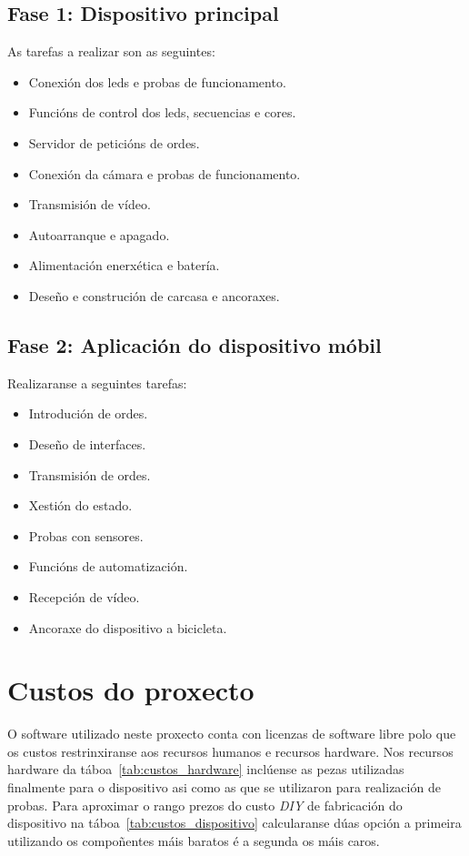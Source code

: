 \subsection{Fase 1: Dispositivo principal}
As tarefas a realizar son as seguintes:
\begin{itemize}
    \item Conexión dos leds e probas de funcionamento.
    \item Funcións de control dos leds, secuencias e cores.
    \item Servidor de peticións de ordes.
    \item Conexión da cámara e probas de funcionamento.
    \item Transmisión de vídeo.
    \item Autoarranque e apagado.
    \item Alimentación enerxética e batería.
    \item Deseño e construción de carcasa e ancoraxes.
\end{itemize}
\subsection{Fase 2: Aplicación do dispositivo móbil}
Realizaranse a seguintes tarefas:
\begin{itemize}

    \item Introdución de ordes.
    \item Deseño de interfaces.
    \item Transmisión de ordes.
    \item Xestión do estado.
    \item Probas con sensores.
    \item Funcións de automatización.
    \item Recepción de vídeo.
    \item Ancoraxe do dispositivo a bicicleta.
\end{itemize}

\section{Custos do proxecto}
O software utilizado neste proxecto conta con licenzas de software libre polo que os custos restrinxiranse aos recursos humanos e recursos hardware.
Nos recursos hardware da táboa~\ref{tab:custos_hardware} inclúense as pezas utilizadas finalmente para o dispositivo asi como as que se utilizaron para realización de probas. Para aproximar o rango prezos do custo \emph{DIY} de fabricación do dispositivo  na táboa~\ref{tab:custos_dispositivo} calcularanse dúas opción a primeira utilizando os compoñentes máis baratos é a segunda os máis caros.


